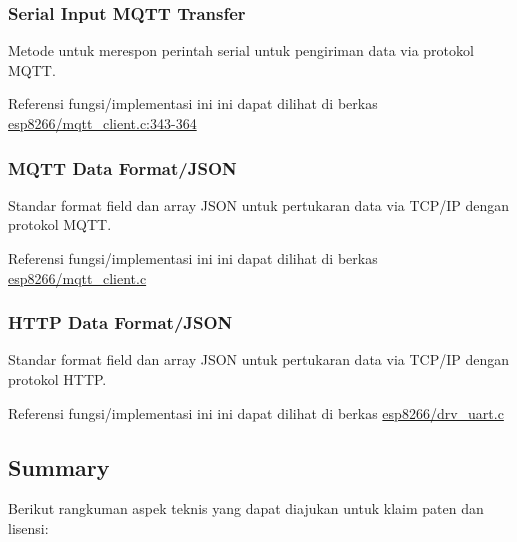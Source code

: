 \documentclass[12pt,]{article}
\begin{document}
	\subsubsection{Serial Input MQTT Transfer}
	
	Metode untuk merespon perintah serial untuk pengiriman data via protokol MQTT.
	
	Referensi fungsi/implementasi ini ini dapat dilihat di berkas
	\href{https://github.com/VibrasticLab/pikoakustik/blob/stm32f401re_3pin/esp8266/user/drv_uart.c#L343-L364}{esp8266/mqtt\_client.c:343-364}

	\subsubsection{MQTT Data Format/JSON}
	
	Standar format field dan array JSON untuk pertukaran data via TCP/IP dengan protokol MQTT.
	
	Referensi fungsi/implementasi ini ini dapat dilihat di berkas
	\href{https://github.com/VibrasticLab/pikoakustik/blob/stm32f401re_3pin/esp8266/user/mqtt\_client.c}{esp8266/mqtt\_client.c}
	
	\subsubsection{HTTP Data Format/JSON}
	
	Standar format field dan array JSON untuk pertukaran data via TCP/IP dengan protokol HTTP.
	
	Referensi fungsi/implementasi ini ini dapat dilihat di berkas
	\href{https://github.com/VibrasticLab/pikoakustik/blob/stm32f401re_3pin/esp8266/user/drv\_uart.c}{esp8266/drv\_uart.c}
	
	\newpage
	\subsection{Summary}
	
	Berikut rangkuman aspek teknis yang dapat diajukan untuk klaim paten dan lisensi:
	
\end{document}
